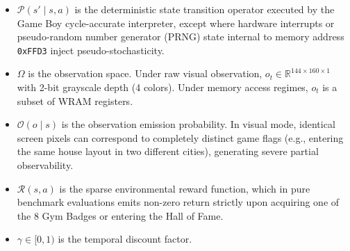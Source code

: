 \documentclass[journal,10pt,twocolumn]{IEEEtran}
\begin{document}
\begin{itemize}
    \item $\mathcal{P}(s' \mid s, a)$ is the deterministic state transition operator executed by the Game Boy cycle-accurate interpreter, except where hardware interrupts or pseudo-random number generator (PRNG) state internal to memory address \texttt{0xFFD3} inject pseudo-stochasticity.
    \item $\Omega$ is the observation space. Under raw visual observation, $o_t \in \mathbb{R}^{144 \times 160 \times 1}$ with 2-bit grayscale depth (4 colors). Under memory access regimes, $o_t$ is a subset of WRAM registers.
    \item $\mathcal{O}(o \mid s)$ is the observation emission probability. In visual mode, identical screen pixels can correspond to completely distinct game flags (e.g., entering the same house layout in two different cities), generating severe partial observability.
    \item $\mathcal{R}(s, a)$ is the sparse environmental reward function, which in pure benchmark evaluations emits non-zero return strictly upon acquiring one of the 8 Gym Badges or entering the Hall of Fame.
    \item $\gamma \in [0, 1)$ is the temporal discount factor.
\end{itemize}

\begin{table}[h]
\centering
\caption{Critical WRAM Memory Addresses in Pok{\'e}mon Red}
\label{tab:wram_registers}
\end{table}
\end{document}

